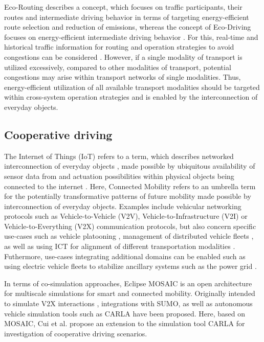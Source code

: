 \documentclass[a4paper,twoside]{article}
\begin{document}
Eco-Routing describes a concept, which focuses on traffic participants, their routes and intermediate driving behavior in terms of targeting energy-efficient route selection and reduction of emissions, whereas the concept of Eco-Driving focuses on energy-efficient intermediate driving behavior \cite{ericsson2006optimizing,Boriboonsomsin2012}. For this, real-time and historical traffic information for routing and operation strategies to avoid congestions can be considered \cite{Boriboonsomsin2012}. However, if a single modality of transport is utilized excessively, compared to other modalities of transport, potential congestions may arise within transport networks of single modalities. Thus, energy-efficient utilization of all available transport modalities should be targeted within cross-system operation strategies and is enabled by the interconnection of everyday objects. 

	\subsection{Cooperative driving}
\label{sec:cooperative-driving}

	
	 The Internet of Things (IoT) refers to a term, which describes networked interconnection of everyday objects \cite{xia2012internet}, made possible by ubiquitous availability of sensor data from and actuation possibilities within physical objects being connected to the internet \cite{kopetz2011internet}. Here, Connected Mobility refers to an umbrella term for the potentially transformative patterns of future mobility made possible by interconnection of everyday objects. Examples include vehicular networking protocols such as Vehicle-to-Vehicle (V2V), Vehicle-to-Infrastructure (V2I) or Vehicle-to-Everything (V2X) communication protocols, but also concern specific use-cases such as vehicle platooning \cite{?}, management of distributed vehicle fleets \cite{?}, as well as using ICT for alignment of different transportation modalities \cite{harris2015ict}. Futhermore, use-cases integrating additional domains can be enabled such as using electric vehicle fleets to stabilize ancillary systems such as the power grid \cite{tomic2007using}.
	
	 In terms of co-simulation approaches, Eclipse MOSAIC \cite{noauthor_eclipse_nodate} is an open architecture for multiscale simulations for smart and connected mobility. Originally intended to simulate V2X interactions \cite{schunemann_v2x_2011}, integrations with SUMO, as well as autonomous vehicle simulation tools such as CARLA \cite{dosovitskiy_carla_2017} have been proposed. Here, based on MOSAIC, Cui et al. \cite{cui_extensible_2023} propose an extension to the simulation tool CARLA for investigation of cooperative driving scenarios. 
	
\end{document}
